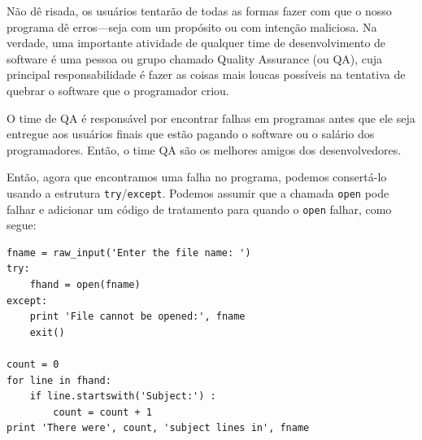 Não dê risada, os usuários tentarão de todas as formas fazer com que
o nosso programa dê erros---seja com um propósito ou com intenção
maliciosa. Na verdade, uma importante atividade de qualquer time de 
desenvolvimento de software é uma pessoa ou grupo chamado {Quality Assurance}
(ou QA), cuja principal responsabilidade é fazer as coisas mais loucas
possíveis na tentativa de quebrar o software que o programador criou.


O time de QA é responsável por encontrar falhas em programas antes que
ele seja entregue aos usuários finais que estão pagando o software
ou o salário dos programadores. Então, o time QA são os melhores amigos
dos desenvolvedores.


Então, agora que encontramos uma falha no programa, podemos consertá-lo
usando a estrutura {\tt try}/{\tt except}. Podemos assumir que a chamada 
{\tt open} pode falhar e adicionar um código de tratamento para quando
o {\tt open} falhar, como segue:

\beforeverb
\begin{verbatim}
fname = raw_input('Enter the file name: ')
try:
    fhand = open(fname)
except:
    print 'File cannot be opened:', fname
    exit()

count = 0
for line in fhand:
    if line.startswith('Subject:') : 
        count = count + 1
print 'There were', count, 'subject lines in', fname
\end{verbatim}
\afterverb

